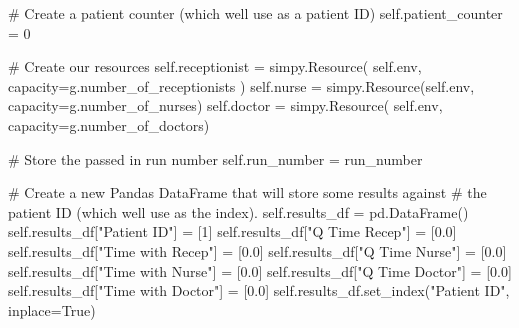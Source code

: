 \documentclass[
  letterpaper,
  DIV=11,
  numbers=noendperiod]{scrreprt}
\newenvironment{Shaded}{}{}
\newcommand{\CommentTok}[1]{\textcolor[rgb]{0.42,0.45,0.49}{#1}}
\newcommand{\DecValTok}[1]{\textcolor[rgb]{0.00,0.36,0.77}{#1}}
\newcommand{\FloatTok}[1]{\textcolor[rgb]{0.00,0.36,0.77}{#1}}
\newcommand{\NormalTok}[1]{\textcolor[rgb]{0.14,0.16,0.18}{#1}}
\newcommand{\OperatorTok}[1]{\textcolor[rgb]{0.14,0.16,0.18}{#1}}
\newcommand{\StringTok}[1]{\textcolor[rgb]{0.01,0.18,0.38}{#1}}
\newcommand{\VariableTok}[1]{\textcolor[rgb]{0.89,0.38,0.04}{#1}}
\begin{document}
\begin{tcolorbox}
\begin{Shaded}
\begin{Highlighting}[]
        \CommentTok{\# Create a patient counter (which we\textquotesingle{}ll use as a patient ID)}
        \VariableTok{self}\NormalTok{.patient\_counter }\OperatorTok{=} \DecValTok{0}

        \CommentTok{\# Create our resources}
        \VariableTok{self}\NormalTok{.receptionist }\OperatorTok{=}\NormalTok{ simpy.Resource(}
            \VariableTok{self}\NormalTok{.env, capacity}\OperatorTok{=}\NormalTok{g.number\_of\_receptionists}
\NormalTok{        )}
        \VariableTok{self}\NormalTok{.nurse }\OperatorTok{=}\NormalTok{ simpy.Resource(}\VariableTok{self}\NormalTok{.env, capacity}\OperatorTok{=}\NormalTok{g.number\_of\_nurses)}
        \VariableTok{self}\NormalTok{.doctor }\OperatorTok{=}\NormalTok{ simpy.Resource(}
            \VariableTok{self}\NormalTok{.env, capacity}\OperatorTok{=}\NormalTok{g.number\_of\_doctors)}

        \CommentTok{\# Store the passed in run number}
        \VariableTok{self}\NormalTok{.run\_number }\OperatorTok{=}\NormalTok{ run\_number}

        \CommentTok{\# Create a new Pandas DataFrame that will store some results against}
        \CommentTok{\# the patient ID (which we\textquotesingle{}ll use as the index).}
        \VariableTok{self}\NormalTok{.results\_df }\OperatorTok{=}\NormalTok{ pd.DataFrame()}
        \VariableTok{self}\NormalTok{.results\_df[}\StringTok{"Patient ID"}\NormalTok{] }\OperatorTok{=}\NormalTok{ [}\DecValTok{1}\NormalTok{]}
        \VariableTok{self}\NormalTok{.results\_df[}\StringTok{"Q Time Recep"}\NormalTok{] }\OperatorTok{=}\NormalTok{ [}\FloatTok{0.0}\NormalTok{]}
        \VariableTok{self}\NormalTok{.results\_df[}\StringTok{"Time with Recep"}\NormalTok{] }\OperatorTok{=}\NormalTok{ [}\FloatTok{0.0}\NormalTok{]}
        \VariableTok{self}\NormalTok{.results\_df[}\StringTok{"Q Time Nurse"}\NormalTok{] }\OperatorTok{=}\NormalTok{ [}\FloatTok{0.0}\NormalTok{]}
        \VariableTok{self}\NormalTok{.results\_df[}\StringTok{"Time with Nurse"}\NormalTok{] }\OperatorTok{=}\NormalTok{ [}\FloatTok{0.0}\NormalTok{]}
        \VariableTok{self}\NormalTok{.results\_df[}\StringTok{"Q Time Doctor"}\NormalTok{] }\OperatorTok{=}\NormalTok{ [}\FloatTok{0.0}\NormalTok{]}
        \VariableTok{self}\NormalTok{.results\_df[}\StringTok{"Time with Doctor"}\NormalTok{] }\OperatorTok{=}\NormalTok{ [}\FloatTok{0.0}\NormalTok{]}
        \VariableTok{self}\NormalTok{.results\_df.set\_index(}\StringTok{"Patient ID"}\NormalTok{, inplace}\OperatorTok{=}\VariableTok{True}\NormalTok{)}


\end{Highlighting}
\end{Shaded}
\end{tcolorbox}
\end{document}
